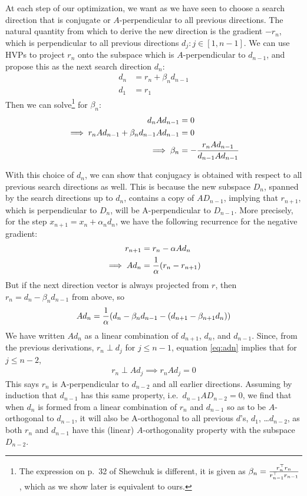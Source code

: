 \documentclass[11pt]{article}
\newcommand{\T}{\top}
\renewcommand{\(}{\left(}
\renewcommand{\)}{\right)}
\begin{document}
\begin{enumerate}

At each step of our optimization, we want as we have seen to choose a
search direction that is conjugate or $A$-perpendicular to all
previous directions. The natural quantity from which to derive the new
direction is the gradient $-r_n$, which is perpendicular to all
previous directions $d_j : j\in [1,n-1]$. We can use HVPs to project
$r_n$ onto the subspace which is $A$-perpendicular to $d_{n-1}$, and
propose this as the next search direction $d_n$:
\begin{align}
d_n &= r_n + \beta_n d_{n-1} \\
d_1 &= r_1
\end{align}
Then we can solve\footnote{The expression on p.~32 of Shewchuk is different, it is given as $\beta_n = {r_n^\T r_n \over r_{n-1}^\T r_{n-1}}$, which as we show later is equivalent to ours.} for $\beta_n$:
\begin{align}
d_n A d_{n-1} & = 0  \\
\implies r_n A d_{n-1} + \beta_n d_{n-1} A d_{n-1} &= 0  \\
\implies \beta_n &= -{r_n A d_{n-1} \over d_{n-1} A d_{n-1}}
\end{align}

With this choice of $d_n$, we can show that conjugacy is obtained with
respect to all previous search directions as well. This is because the
new subspace $D_n$, spanned by the search directions up to $d_n$,
contains a copy of $A D_{n-1}$, implying that $r_{n+1}$, which is
perpendicular to $D_n$, will be A-perpendicular to $D_{n-1}$. More
precisely, for the step $x_{n+1} = x_n + \alpha_n d_n$, we have the
following recurrence for the negative gradient:
\begin{align}
r_{n+1} &= r_n - \alpha A d_n \label{eq:radnrec} \\
\implies A d_n &= {1\over \alpha}(r_n - r_{n+1}) \label{eq:adnrndiff}
\end{align}
But if the next direction vector is always projected from $r$, then
$r_n = d_n - \beta_n d_{n-1}$ from above, so
\begin{align}
A d_n = {1\over \alpha} (d_n -\beta_n d_{n-1}-(d_{n+1}-\beta_{n+1}d_n)) \label{eq:adn}
\end{align}
We have written $A d_n$ as a linear combination of $d_{n+1}$, $d_n$,
and $d_{n-1}$. Since, from the previous derivations, $r_n \perp d_j$
for $j\leq n-1$, equation \ref{eq:adn} implies that for $j\leq n-2$,
\begin{align}
r_n \perp A d_j
\implies r_n A d_j = 0
\end{align}
This says $r_n$ is A-perpendicular to $d_{n-2}$ and all earlier
directions. Assuming by induction that $d_{n-1}$ has this same
property, i.e.~$d_{n-1}A D_{n-2}=0$, we find that when $d_n$ is formed
from a linear combination of $r_n$ and $d_{n-1}$ so as to be
$A$-orthogonal to $d_{n-1}$, it will also be A-orthogonal to all
previous $d$'s, $d_1$, \ldots $d_{n-2}$, as both $r_n$ and $d_{n-1}$
have this (linear) $A$-orthogonality property with the subspace
$D_{n-2}$.

\end{enumerate}
\end{document}

